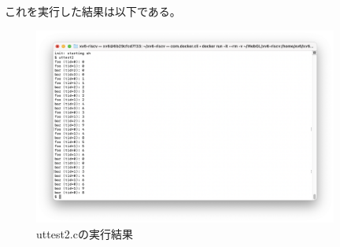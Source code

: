\documentclass[11pt,a4paper]{jsarticle}
\begin{document}
これを実行した結果は以下である。
\begin{figure}[H]
  \centering
 \includegraphics[width=10cm]{image/image2.png}
  \caption{uttest2.cの実行結果}
\end{figure}
\end{document}
